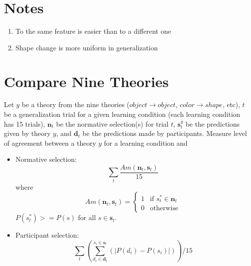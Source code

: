 \documentclass{article}
\begin{document}
\section{Notes}

\begin{enumerate}
\item To the same feature is easier than to a different one
\item Shape change is more uniform in generalization
\end{enumerate}

\section{Compare Nine Theories}

Let $y$ be a theory from the nine theories ($object \to object$, $color \to shape$, etc), $t$ be a generalization trial for a given learning condition (each learning condition has 15 trials), $\mathbf{n}_t$ be the normative selection(s) for trial $t$, $\mathbf{s}_t^y$ be the predictions given by theory $y$, and $\mathbf{d}_t$ be the predictions made by participants.
%
Measure level of agreement between a theory $y$ for a learning condition and
\begin{itemize}
  \item Normative selection: 
    $$\sum_{t}\frac{Am(\mathbf{n}_t, \mathbf{s}_t)}{15}$$
    where 
    \[
    Am(\mathbf{n}_t, \mathbf{s}_t)=
      \begin{cases}
        1 & \text{if } s^*_t \in \mathbf{n}_t\\
        0 & \text{otherwise}
      \end{cases}
    \]
    $P(s^*_t) >= P(s)$ for all $s \in \mathbf{s}_t$.
  \item Participant selection:
    $$\sum_{t}(\sum_{d_i \in \mathbf{d}_t}^{s_i \in \mathbf{s}_t}(|P(d_i) - P(s_i)|))/15$$
\end{itemize}
\end{document}

